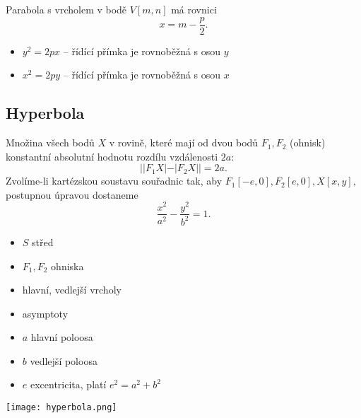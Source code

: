 \begin{pozn}
    Parabola s vrcholem v bodě $V[m,n]$ má rovnici
    $$x=m-\frac{p}{2}.$$
\end{pozn}

\begin{pozn}
\begin{itemize}
\item $y^2=2px$ -- řídící přímka je rovnoběžná s osou $y$
\item $x^2=2py$ -- řídící přímka je rovnoběžná s osou $x$
\end{itemize}
\end{pozn}

\subsection{Hyperbola}
Množina všech bodů $X$ v rovině, které mají od dvou bodů $F_1, F_2$
(ohnisk) konstantní absolutní hodnotu rozdílu vzdálenosti $2a$:
$$||F_1X|-|F_2X||=2a.$$
Zvolíme-li kartézskou soustavu souřadnic tak, aby $F_1[-e,0], F_2[e,0],
X[x,y],$ postupnou úpravou dostaneme
$$\frac{x^2}{a^2}-\frac{y^2}{b^2}=1.$$

\begin{minipage}{0.48\linewidth}
\begin{itemize}
\item $S$ střed
\item $F_1,F_2$ ohniska
\item hlavní, vedlejší vrcholy
\item asymptoty
\item $a$ hlavní poloosa
\item $b$ vedlejší poloosa
\item $e$ excentricita, platí $e^2=a^2+b^2$
\end{itemize}
\end{minipage}
\hfill
\begin{minipage}{0.48\linewidth}
    \texttt{[image: hyperbola.png]}
\end{minipage}
